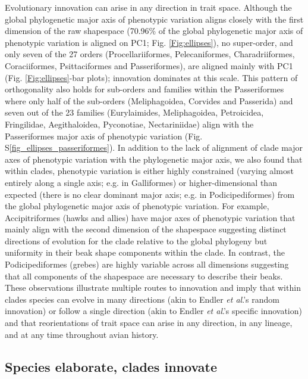 \documentclass[12pt,letterpaper]{article}
\begin{document}
Evolutionary innovation can arise in any direction in trait space.
Although the global phylogenetic major axis of phenotypic variation aligns closely with the first dimension of the raw shapespace (70.96\% of the global phylogenetic major axis of phenotypic variation is aligned on PC1; Fig. \ref{Fig:ellipses}), no super-order, and only seven of the 27 orders (Procellariiformes, Pelecaniformes, Charadriiformes, Coraciiformes, Psittaciformes and Passeriformes), are aligned mainly with PC1 (Fig. \ref{Fig:ellipses}-bar plots); innovation dominates at this scale.
This pattern of orthogonality also holds for sub-orders and families within the Passeriformes where only half of the sub-orders (Meliphagoidea, Corvides and Passerida) and seven out of the 23 families (Eurylaimides, Meliphagoidea, Petroicidea, Fringilidae, Aegithaloidea, Pyconotiae, Nectariniidae) align with the Passeriformes major axis of phenotypic variation (Fig. S\ref{fig_ellipses_passeriformes}).
In addition to the lack of alignment of clade major axes of phenotypic variation with the phylogenetic major axis, we also found that within clades, phenotypic variation is either highly constrained (varying almost entirely along a single axis; e.g. in Galliformes) or higher-dimensional than expected (there is no clear dominant major axis; e.g. in Podicipediformes) from the global phylogenetic major axis of phenotypic variation.
For example, Accipitriformes (hawks and allies) have major axes of phenotypic variation that mainly align with the second dimension of the shapespace suggesting distinct directions of evolution for the clade relative to the global phylogeny but uniformity in their beak shape components within the clade.
In contrast, the Podicipediformes (grebes) are highly variable across all dimensions suggesting that all components of the shapespace are necessary to describe their beaks.
These observations illustrate multiple routes to innovation and imply that within clades species can evolve in many directions (akin to Endler \textit{et al}.'s \cite{endler2005animal} random innovation) or follow a single direction (akin to Endler \textit{et al}.'s \cite{endler2005animal} specific innovation) and that reorientations of trait space can arise in any direction, in any lineage, and at any time throughout avian history.


\subsection{Species elaborate, clades innovate}
\end{document}
